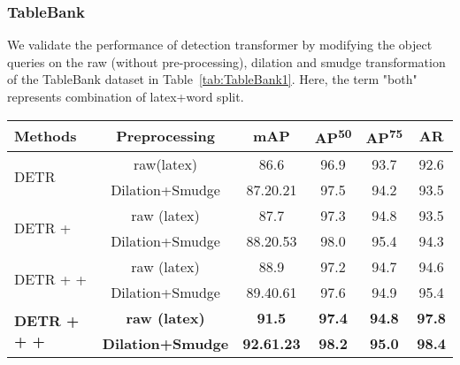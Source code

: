 \documentclass[sn-mathphys]{sn-jnl}\jyear{2021}\theoremstyle{thmstyleone}\newtheorem{theorem}{Theorem}\newtheorem{proposition}[theorem]{Proposition}\theoremstyle{thmstyletwo}\newtheorem{example}{Example}\newtheorem{remark}{Remark}\theoremstyle{thmstylethree}\newtheorem{definition}{Definition}\usepackage{amsmath}
\begin{document}
\subsubsection{TableBank}
\label{sec:TableBank-results}
We validate the performance of detection transformer by modifying the object queries on the raw (without pre-processing), dilation and smudge transformation of the TableBank dataset in Table~\ref{tab:TableBank1}. Here, the term "both" represents combination of latex+word split.  
\begin{table*}
\tiny
\begin{center}
\caption{Comparison between transformer-based detector results on raw (without pre-processing), dilation and smudge transformation of the TableBank dataset. Here, term  represents object queries as anchor boxes,  denotes object queries with positive noise and  indicates object queries with negative noise. The IoU thresholds are set to 0.5 and 0.75 for average precision calculation and also calculate average recall for large objects. AR represents Average Recall for a large area. The best results are highlighted.}\label{tab:TableBank1}
\renewcommand{\arraystretch}{1} \begin{tabular*}{\textwidth}{@{\extracolsep{\fill}}lccccc@{\extracolsep{\fill}}}
\toprule
\textbf{Methods} &
\textbf{Preprocessing} &
\textbf{mAP} & 
\textbf{AP\textsuperscript{50}} &
\textbf{AP\textsuperscript{75}}  & \textbf{AR} \\
\midrule
\multirow{2}{*}{DETR} & raw(latex) & 86.6& 96.9 & 93.7& 92.6\\
& Dilation+Smudge & 87.20.21 & 97.5 & 94.2 & 93.5\\
\midrule

\multirow{2}{*}{DETR + } & raw (latex)  & 87.7 & 97.3 & 94.8  & 93.5\\
& Dilation+Smudge  & 88.20.53 & 98.0 & 95.4 & 94.3\\
\midrule

\multirow{2}{*}{DETR +  + } & raw (latex)  & 88.9 & 97.2 & 94.7 & 94.6 \\
& Dilation+Smudge  & 89.40.61 & 97.6 & 94.9 & 95.4\\
\midrule

\multirow{2}{*}{\textbf{DETR +  +  + }} & \textbf{raw (latex)} & \textbf{91.5} & \textbf{97.4} & \textbf{94.8} & \textbf{97.8}\\
& \textbf{Dilation+Smudge} & \textbf{92.61.23} & \textbf{98.2} & \textbf{95.0} & \textbf{98.4}\\
\midrule


\end{tabular*}
\end{center}
\end{table*}
\end{document}
